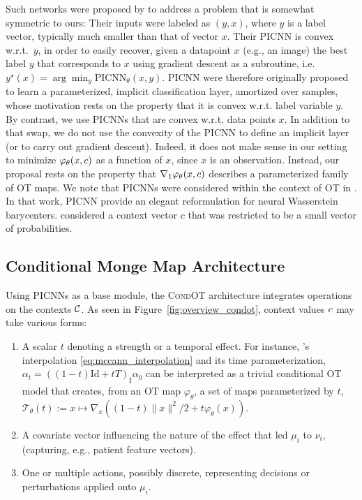 Such networks were proposed by \citet[Eq. 3]{amos2017input} to address a problem that is somewhat symmetric to ours: Their inputs were labeled as $(y, x)$, where $y$ is a label vector, typically much smaller than that of vector $x$. Their PICNN is convex w.r.t.~$y$, in order to easily recover, given a datapoint $x$ (e.g., an image) the best label $y$ that corresponds to $x$ using gradient descent as a subroutine, i.e. $y^\star(x) = \arg\min_y \text{PICNN}_\theta(x,y)$. PICNN were therefore originally proposed to learn a parameterized, implicit classification layer, amortized over samples, whose motivation rests on the property that it is convex w.r.t. label variable $y$. By contrast, we use PICNNs that are convex w.r.t. data points $x$. In addition to that swap, we do not use the convexity of the PICNN to define an implicit layer (or to carry out gradient descent). Indeed, it does not make sense in our setting to minimize $\varphi_\theta(x,c)$ as a function of $x$, since $x$ is an observation. Instead, our proposal rests on the property that $\nabla_1 \varphi_\theta(x,c)$ describes a parameterized family of OT maps. We note that PICNNs were considered within the context of OT in \cite[Appendix B]{fan2021scalable}. In that work, PICNN provide an elegant reformulation for neural Wasserstein barycenters. \citet{fan2021scalable} considered a context vector $c$ that was restricted to be a small vector of probabilities.


\subsection{Conditional Monge Map Architecture}\label{subsec:combin}
Using PICNNs as a base module, the \textsc{CondOT} architecture integrates operations on the contexts ${\mathcal{C}}$. As seen in Figure~\ref{fig:overview_condot}, context values $c$ may take various forms:
\begin{enumerate}[noitemsep,leftmargin=.35cm,topsep=0pt,parsep=0pt,partopsep=0pt]
\item A scalar $t$ denoting a strength or a temporal effect. For instance, \citeauthor{mccann1997convexity}'s interpolation \eqref{eq:mccann_interpolation} and its time parameterization, $\alpha_{t}=((1-t) \text{Id}+t T)_{\sharp} \alpha_{0}$ \citep{mccann1997convexity} can be interpreted as a trivial conditional OT model that creates, from an OT map $\varphi_\theta$, a set of maps parameterized by $t$, $\mathcal{T}_\theta(t):=x\mapsto\nabla_x \left((1-t)\|x\|^2/2 +t \varphi_\theta(x)\right)$.
\item A covariate vector influencing the nature of the effect that led $\mu_i$ to $\nu_i$, (capturing, e.g., patient feature vectors).
\item One or multiple actions, possibly discrete, representing decisions or perturbations applied onto $\mu_i$.
\end{enumerate}

